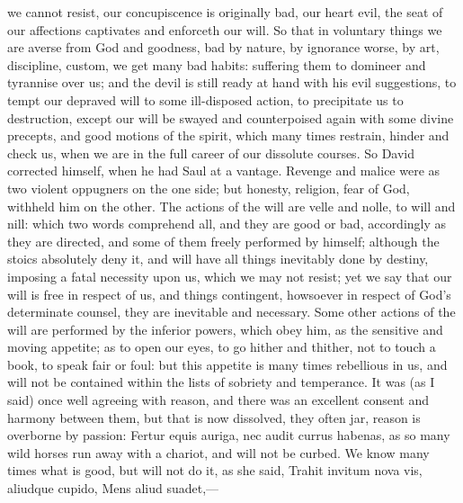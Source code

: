 {we cannot resist, our concupiscence is originally bad, our heart evil,
the seat of our affections captivates and enforceth our will. So that
in voluntary things we are averse from God and goodness, bad by nature,
by ignorance worse, by art, discipline, custom, we get many bad
habits: suffering them to domineer and tyrannise over us; and the devil
is still ready at hand with his evil suggestions, to tempt our depraved
will to some ill-disposed action, to precipitate us to destruction,
except our will be swayed and counterpoised again with some divine
precepts, and good motions of the spirit, which many times restrain,
hinder and check us, when we are in the full career of our dissolute
courses. So David corrected himself, when he had Saul at a vantage.
Revenge and malice were as two violent oppugners on the one side; but
honesty, religion, fear of God, withheld him on the other.
The actions of the will are velle and nolle, to will and nill: which
two words comprehend all, and they are good or bad, accordingly as they
are directed, and some of them freely performed by himself; although
the stoics absolutely deny it, and will have all things inevitably done
by destiny, imposing a fatal necessity upon us, which we may not
resist; yet we say that our will is free in respect of us, and things
contingent, howsoever in respect of God's determinate counsel, they are
inevitable and necessary. Some other actions of the will are performed
by the inferior powers, which obey him, as the sensitive and moving
appetite; as to open our eyes, to go hither and thither, not to touch a
book, to speak fair or foul: but this appetite is many times rebellious
in us, and will not be contained within the lists of sobriety and
temperance. It was (as I said) once well agreeing with reason, and
there was an excellent consent and harmony between them, but that is
now dissolved, they often jar, reason is overborne by passion: Fertur
equis auriga, nec audit currus habenas, as so many wild horses run away
with a chariot, and will not be curbed. We know many times what is
good, but will not do it, as she said,
Trahit invitum nova vis, aliudque cupido,
Mens aliud suadet,---

}
